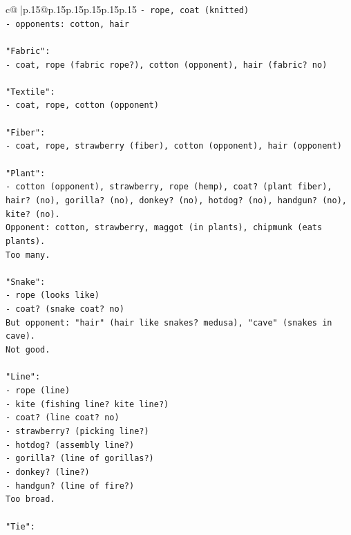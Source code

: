 \documentclass{article}
\begin{document}
{\begin{supertabular}{c@{$\;$}|p{.15\linewidth}@{}p{.15\linewidth}p{.15\linewidth}p{.15\linewidth}p{.15\linewidth}p{.15\linewidth}}
{{{\texttt{{-} rope, coat (knitted)} \\
\texttt{{-} opponents: cotton, hair} \\
\\ 
\texttt{"Fabric":} \\
\texttt{{-} coat, rope (fabric rope?), cotton (opponent), hair (fabric? no)} \\
\\ 
\texttt{"Textile":} \\
\texttt{{-} coat, rope, cotton (opponent)} \\
\\ 
\texttt{"Fiber":} \\
\texttt{{-} coat, rope, strawberry (fiber), cotton (opponent), hair (opponent)} \\
\\ 
\texttt{"Plant":} \\
\texttt{{-} cotton (opponent), strawberry, rope (hemp), coat? (plant fiber), hair? (no), gorilla? (no), donkey? (no), hotdog? (no), handgun? (no), kite? (no).} \\
\texttt{Opponent: cotton, strawberry, maggot (in plants), chipmunk (eats plants).} \\
\texttt{Too many.} \\
\\ 
\texttt{"Snake":} \\
\texttt{{-} rope (looks like)} \\
\texttt{{-} coat? (snake coat? no)} \\
\texttt{But opponent: "hair" (hair like snakes? medusa), "cave" (snakes in cave).} \\
\texttt{Not good.} \\
\\ 
\texttt{"Line":} \\
\texttt{{-} rope (line)} \\
\texttt{{-} kite (fishing line? kite line?)} \\
\texttt{{-} coat? (line coat? no)} \\
\texttt{{-} strawberry? (picking line?)} \\
\texttt{{-} hotdog? (assembly line?)} \\
\texttt{{-} gorilla? (line of gorillas?)} \\
\texttt{{-} donkey? (line?)} \\
\texttt{{-} handgun? (line of fire?)} \\
\texttt{Too broad.} \\
\\ 
\texttt{"Tie":} \\
}}}
\end{supertabular}}
\end{document}
